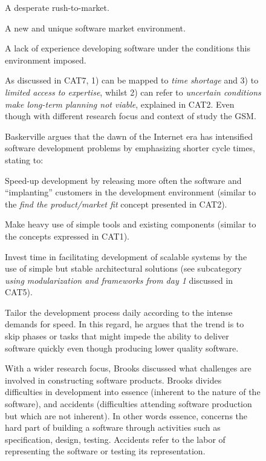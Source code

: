\documentclass[12pt,journal,compsoc]{../sty/IEEEtran}
\begin{document}
\begin{table}[!t]
\begin{figure}[!t]
\begin{compactitem}
\begin{compactenum}

\item A desperate rush-to-market. \item A new and unique software market
environment. \item A lack of experience developing software under the conditions
this  environment imposed.

\end{compactenum}

As discussed in CAT7, 1) can be mapped to \textit{time shortage} and 3) to
\textit{limited access to expertise}, whilst  2) can refer to \textit{uncertain
conditions make long-term planning not viable}, explained in CAT2. Even though
with different research focus and context of study %
the GSM.

Baskerville argues that the dawn of the Internet era has intensified software
development problems by emphasizing shorter cycle times, stating to:

\begin{compactitem} \item Speed-up development by releasing more often the
software and  ``implanting'' customers in the development environment (similar
to the  \textit{find the product/market fit} concept presented in CAT2).  \item
Make heavy use of simple tools and existing components (similar to the  concepts
expressed in CAT1). \item Invest time in facilitating development of scalable
systems by the use of  simple but stable architectural solutions (see
subcategory \textit{using  modularization and frameworks from day 1} discussed
in CAT5).  \item Tailor the development process daily according to the intense
demands for  speed. In this regard, he argues that the trend is to skip phases
or tasks that  might impede the ability to deliver software quickly even though
producing lower  quality software.
  

\end{compactitem}

With a wider research focus, Brooks \cite{BrooksJr1987} discussed what
challenges are involved in constructing software products. Brooks divides
difficulties in development into essence (inherent to the nature of the
software), and accidents (difficulties attending software production but which
are not inherent). In other words essence, concerns the hard part of building a
software through activities such as specification, design, testing. Accidents
refer to the labor of representing the software or testing its representation.


\end{compactitem}
\end{figure}
\end{table}
\end{document}
